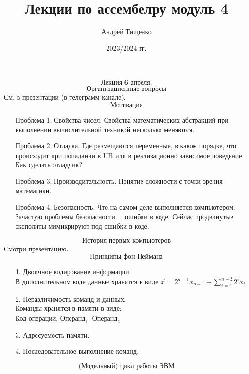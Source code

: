 \documentclass[12pt, letterpaper, twoside]{article}
\title{Лекции по ассембелру модуль 4}
\author{Андрей Тищенко}
\date{2023/2024 гг.}
\begin{document}
    \maketitle
    \[\textbf{Лекция 6 апреля.}\]   
    \[\text{Организационные вопросы}\]
    См. в презентации (в телеграмм канале).
    \[\text{Мотивация}\]
    \begin{enumerate}
        \item[Проблема 1.] Свойства чисел. Свойства математических абстракций при выполнении вычислительной техникой несколько меняются.
        \item[Проблема 2.] Отладка. Где размещаются переменные, в каком порядке, что происходит при попадании в UB или в реализационно зависимое поведение. Как сделать отладчик?
        \item[Проблема 3.] Производительность. Понятие сложности с точки зрения математики. 
        \item[Проблема 4.] Безопасность. Что на самом деле выполняется компьютером. Зачастую проблемы безопасности = ошибки в коде. Сейчас продвинутые эксполиты мимикрируют под ошибки в коде.   
    \end{enumerate}
    \[\text{История первых компьютеров}\]
    Смотри презентацию.
    \[\text{Принципы фон Неймана}\]
    \begin{enumerate}
        \item[1.] Двоичное кодирование информации.\\
        В дополнительном коде данные хранятся в виде $\displaystyle\vec{x} =  2^{n - 1}x_{n - 1} + \sum_{i = 0}^{n - 2} 2^{i}x_{i}$
        \item[2.] Неразличимость команд и данных.\\
        Команды хранятся в памяти в виде:\\
        Код операции, $\text{Операнд}_1$, $\text{Операнд}_2$
        \item[3.] Адресуемость памяти.
        \item[4.] Последовательное выполнение команд. 
    \end{enumerate}
    \[\text{(Модельный) цикл работы ЭВМ}\]
\end{document}
